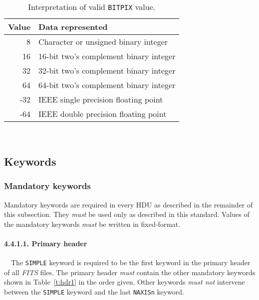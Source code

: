 \documentclass[onecolumn]{aa}
\begin{document}
\begin{table}
\centering
\caption{Interpretation of valid {\tt BITPIX} value.}
\label{t:bitpix}
\begin{tabular}{rl} 
\hline \hline
Value & Data represented  \\
\hline
          8 & Character or unsigned binary integer     \\
         16 & 16-bit two's complement binary integer    \\ 
         32 & 32-bit two's complement binary integer    \\ 
         64 & 64-bit two's complement binary integer    \\ 
        -32 & IEEE single precision floating point     \\
        -64 & IEEE double precision floating point     \\
\hline
\end{tabular}
\end{table}

 \ \newline \ \newline \ \newline \ \newline \ \newline \ \newline \ \newline \ \newline
\ \newline \ \newline \ \newline \ \newline 

  \subsection{Keywords}
   \label{s:key}
                                   
   \subsubsection{Mandatory keywords}
   Mandatory keywords are required in every HDU as 
   described in the remainder of this subsection. They {\em must} be used only as
   described in this standard. \label{s:man}
   Values of the mandatory keywords {\em must} be written in fixed-format.
  
   \paragraph{4.4.1.1. Primary header}
   \label{s:keyprime}
\ \newline \ \newline   The {\tt SIMPLE} keyword is
   required to be the first keyword in the primary
   header of all {\em FITS\/} files.  
   The primary header {\em must} contain the other mandatory keywords 
   shown in Table~\ref{t:hdr1} in the 
   order
   given. \label{s:pman} Other keywords {\em must not} intervene between
   the {\tt SIMPLE} keyword and the last {\tt NAXISn} keyword.
\end{document}
